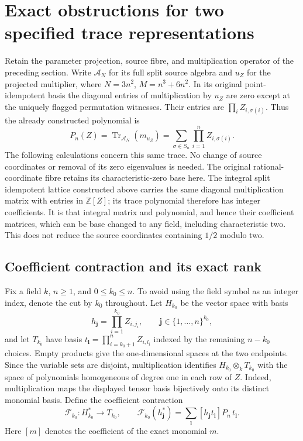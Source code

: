 \section{Exact obstructions for two specified trace representations}
\label{sec:per-trace-obstructions}

Retain the parameter projection, source fibre, and multiplication operator
of the preceding section. Write $\mathcal A_N$ for its full split source
algebra and $u_Z$ for the projected multiplier, where
$N=3n^2$, $M=n^3+6n^2$. In its original point-idempotent basis the
diagonal entries of multiplication by $u_Z$ are zero except at the
uniquely flagged permutation witnesses. Their entries are
$\prod_i Z_{i,\sigma(i)}$. Thus the already constructed polynomial is
\[
 P_n(Z)=\operatorname{Tr}_{\mathcal A_N}(m_{u_Z})
       =\sum_{\sigma\in S_n}\prod_{i=1}^n Z_{i,\sigma(i)}.
\]
The following calculations concern this same trace. No change of source
coordinates or removal of its zero eigenvalues is needed. The original
rational-coordinate fibre retains its characteristic-zero base here.
The integral split idempotent lattice constructed above carries the
same diagonal multiplication matrix with entries in $\mathbb Z[Z]$;
its trace polynomial therefore has integer coefficients. It is that
integral matrix and polynomial, and hence their coefficient matrices,
which can be base changed to any field, including characteristic two.
This does not reduce the source coordinates containing $1/2$ modulo two.

\subsection{Coefficient contraction and its exact rank}

Fix a field $k$, $n\ge1$, and $0\le k_0\le n$. To avoid using the
field symbol as an integer index, denote the cut by $k_0$ throughout.
Let $H_{k_0}$ be the vector space with basis
\[
 h_{\boldsymbol j}=\prod_{i=1}^{k_0}Z_{i,j_i},
 \qquad \boldsymbol j\in\{1,\ldots,n\}^{k_0},
\]
and let $T_{k_0}$ have basis
$t_{\boldsymbol l}=\prod_{i=k_0+1}^{n}Z_{i,l_i}$ indexed by the
remaining $n-k_0$ choices. Empty products give the one-dimensional
spaces at the two endpoints. Since the variable sets are disjoint,
multiplication identifies $H_{k_0}\otimes_k T_{k_0}$ with the space
of polynomials homogeneous of degree one in each row of $Z$.
Indeed, multiplication maps the displayed tensor basis bijectively
onto its distinct monomial basis. Define the coefficient contraction
\[
 \mathcal F_{k_0}:H_{k_0}^*\longrightarrow T_{k_0},\qquad
 \mathcal F_{k_0}(h_{\boldsymbol j}^*)
  =\sum_{\boldsymbol l}
   [h_{\boldsymbol j}t_{\boldsymbol l}]P_n\,t_{\boldsymbol l}.
\]
Here $[m]$ denotes the coefficient of the exact monomial $m$.

